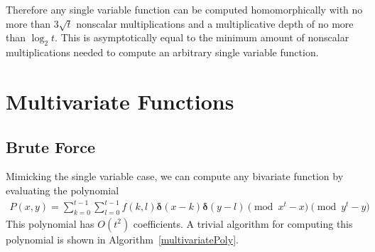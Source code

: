 \documentclass{article}
\begin{document}
    Therefore any single variable function can be computed homomorphically with no more than
    $3\sqrt{t}$ nonscalar multiplications and a multiplicative depth of no more than $\log_2 t$.
    This is asymptotically equal to the minimum amount of nonscalar multiplications needed to compute an arbitrary single variable function.

    \section{Multivariate Functions}
    \subsection{Brute Force}
        Mimicking the single variable case,
        we can compute any bivariate function by evaluating the polynomial
        \begin{align}
            P(x,y)
            =
            \sum_{k = 0}^{t - 1}
            \sum_{l = 0}^{t - 1}
            f(k, l)
            \mathbf{\delta}(x - k)
            \mathbf{\delta}(y - l)
            \pmod{x^t - x}
            \pmod{y^t - y}
        \end{align}
        This polynomial has $O(t^2)$ coefficients. 
        A trivial algorithm for computing this polynomial is shown in Algorithm~\ref{multivariatePoly}.
\end{document}
